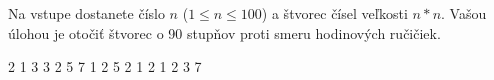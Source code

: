 




Na vstupe dostanete číslo $n$ ($1\leq n \leq 100$) a štvorec čísel veľkosti $n*n$. Vašou úlohou je
otočiť štvorec o 90 stupňov proti smeru hodinových ručičiek.

2 1 3 
3 2 5 
7 1 2 
 5 2 
1 2 1 
2 3 7 
\koniec



